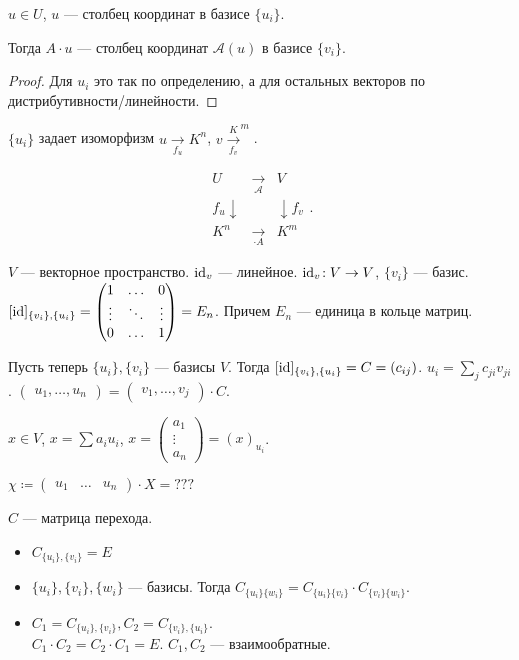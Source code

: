 \begin{statement}
    $u \in U$,  $u$ --- столбец координат в базисе  $\{u_i\}$.

    Тогда  $A \cdot u$ --- столбец координат  $\mathcal{A}(u)$ в базисе  $\{v_i\}$.
\end{statement}
\begin{proof}
    Для $u_i$ это так по определению, а для остальных векторов по дистрибутивности/линейности. 
\end{proof}
\begin{remark}
    $\{u_i\}$ задает изоморфизм  $u \xrightarrow[f_u]{} K^n$,  $v \xrightarrow[f_v] K^m$.

    \[
    \begin{matrix}
        U & \xrightarrow[\mathcal{A}]{} & V \\
        f_u \downarrow & & \downarrow f_v \\
        K^n & \xrightarrow[\cdot A]{} & K^m
    \end{matrix}
    .\] 
\end{remark}

$V$ --- векторное пространство.  $\operatorname{id}_v$ --- линейное.  $\operatorname{id}_v\!: V \to V$,  $\{v_i\}$ --- базис.  $[\operatorname{id}]_{\{v_i\}, \{u_i\}} = \begin{pmatrix} 1 & \ldots & 0 \\ \vdots & \ddots & \vdots \\ 0 & \ldots & 1 \end{pmatrix} = E_n$. Причем  $E_n$ --- единица в кольце матриц.


Пусть теперь $\{u_i\}, \{v_i\}$ --- базисы  $V$. Тогда  $[\operatorname{id}]_{\{v_i\}, \{u_i\}} = C = (c_{ij})$. $u_i = \sum_j c_{ji} v_{ji}$.  $\begin{pmatrix} u_1, \ldots, u_n\end{pmatrix} = \begin{pmatrix}v_1, \ldots, v_j \end{pmatrix} \cdot C$.

$x\in V$,  $x = \sum a_i u_i$,  $x = \begin{pmatrix} a_1 \\ \vdots \\ a_n \end{pmatrix} = (x)_{u_i}$.

$\chi \coloneqq \begin{pmatrix} u_1 & \ldots & u_n \end{pmatrix} \cdot X= ???$

$C$ --- матрица перехода.
 \begin{remark}
\begin{itemize}
    \item $C_{\{u_i\}, \{v_i\}} = E$
    \item $\{u_i\}, \{v_i\}, \{w_i\}$ --- базисы. Тогда $C_{\{u_i\}\{w_i\}} = C_{\{u_i\}\{v_i\}} \cdot C_{\{v_i\}\{w_i\}}$.
    \item  $C_1 = C_{\{u_i\}, \{v_i\}}, C_2 = C_{\{v_i\}, \{u_i\}}$. \\
        $C_1 \cdot C_2 = C_2 \cdot C_1 = E$. $C_1, C_2$ --- взаимообратные.
\end{itemize}
\end{remark}

